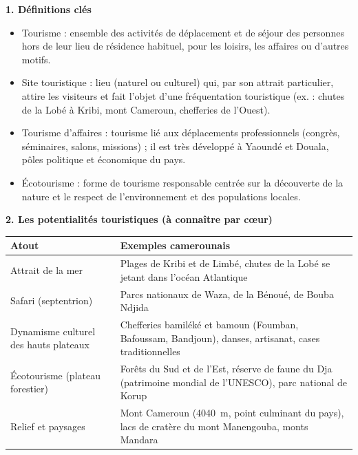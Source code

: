 \documentclass[11pt]{article}
\newcommand{\cle}[1]{{\popxbold\color{popdark}#1}}
\newcounter{popsec}
\newcounter{popsub}
\newcommand{\courssub}[1]{%
  \stepcounter{popsub}%
  \par\vspace{9pt}\noindent{\popxbold\fontsize{11.5}{13}\selectfont\color{popink}{\color{poporange}\thepopsec.\thepopsub}\hspace{6pt}#1}\par\nopagebreak\vspace{4pt}
}
\begin{document}
\courssub{L'essentiel à retenir}

\begin{aretenir}
\textbf{1. Définitions clés}
\begin{itemize}
  \item \cle{Tourisme} : ensemble des activités de déplacement et de séjour des personnes hors de leur lieu de résidence habituel, pour les loisirs, les affaires ou d'autres motifs.
  \item \cle{Site touristique} : lieu (naturel ou culturel) qui, par son attrait particulier, attire les visiteurs et fait l'objet d'une fréquentation touristique (ex. : chutes de la Lobé à Kribi, mont Cameroun, chefferies de l'Ouest).
  \item \cle{Tourisme d'affaires} : tourisme lié aux déplacements professionnels (congrès, séminaires, salons, missions) ; il est très développé à Yaoundé et Douala, pôles politique et économique du pays.
  \item \cle{Écotourisme} : forme de tourisme responsable centrée sur la découverte de la nature et le respect de l'environnement et des populations locales.
\end{itemize}

\textbf{2. Les potentialités touristiques (à connaître par cœur)}
\begin{center}
\begin{tabularx}{\linewidth}{|l|X|}
\hline
\rowcolor{popblueL} \textbf{Atout} & \textbf{Exemples camerounais} \\
\hline
Attrait de la mer & Plages de Kribi et de Limbé, chutes de la Lobé se jetant dans l'océan Atlantique \\
\hline
Safari (septentrion) & Parcs nationaux de Waza, de la Bénoué, de Bouba Ndjida \\
\hline
Dynamisme culturel des hauts plateaux & Chefferies bamiléké et bamoun (Foumban, Bafoussam, Bandjoun), danses, artisanat, cases traditionnelles \\
\hline
Écotourisme (plateau forestier) & Forêts du Sud et de l'Est, réserve de faune du Dja (patrimoine mondial de l'UNESCO), parc national de Korup \\
\hline
Relief et paysages & Mont Cameroun (\SI{4040}{m}, point culminant du pays), lacs de cratère du mont Manengouba, monts Mandara \\
\hline
\end{tabularx}
\end{center}


\end{aretenir}
\end{document}
